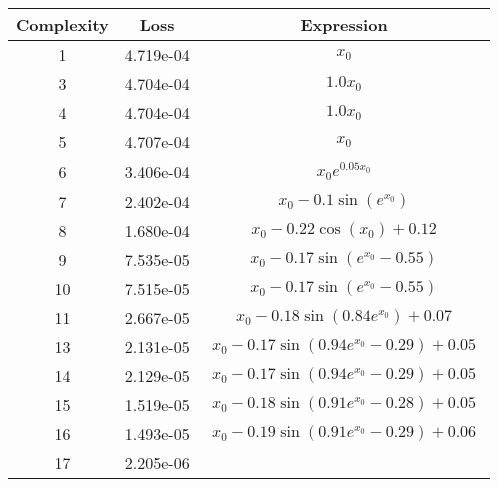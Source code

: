 \begin{center}
        \begin{tabular}{|c|c|c|}
        \hline
        Complexity & Loss & Expression \\
        \hline
        1 & 4.719e-04 & $\begin{aligned}x_{0}\end{aligned}$\\ \hline3 & 4.704e-04 & $\begin{aligned}1.0 x_{0}\end{aligned}$\\ \hline4 & 4.704e-04 & $\begin{aligned}1.0 x_{0}\end{aligned}$\\ \hline5 & 4.707e-04 & $\begin{aligned}x_{0}\end{aligned}$\\ \hline6 & 3.406e-04 & $\begin{aligned}x_{0} e^{0.05 x_{0}}\end{aligned}$\\ \hline7 & 2.402e-04 & $\begin{aligned}x_{0} - 0.1 \sin{\left(e^{x_{0}} \right)}\end{aligned}$\\ \hline8 & 1.680e-04 & $\begin{aligned}x_{0} - 0.22 \cos{\left(x_{0} \right)} + 0.12\end{aligned}$\\ \hline9 & 7.535e-05 & $\begin{aligned}x_{0} - 0.17 \sin{\left(e^{x_{0}} - 0.55 \right)}\end{aligned}$\\ \hline10 & 7.515e-05 & $\begin{aligned}x_{0} - 0.17 \sin{\left(e^{x_{0}} - 0.55 \right)}\end{aligned}$\\ \hline11 & 2.667e-05 & $\begin{aligned}x_{0} - 0.18 \sin{\left(0.84 e^{x_{0}} \right)} + 0.07\end{aligned}$\\ \hline13 & 2.131e-05 & $\begin{aligned}x_{0} - 0.17 \sin{\left(0.94 e^{x_{0}} - 0.29 \right)} + 0.05\end{aligned}$\\ \hline14 & 2.129e-05 & $\begin{aligned}x_{0} - 0.17 \sin{\left(0.94 e^{x_{0}} - 0.29 \right)} + 0.05\end{aligned}$\\ \hline15 & 1.519e-05 & $\begin{aligned}x_{0} - 0.18 \sin{\left(0.91 e^{x_{0}} - 0.28 \right)} + 0.05\end{aligned}$\\ \hline16 & 1.493e-05 & $\begin{aligned}x_{0} - 0.19 \sin{\left(0.91 e^{x_{0}} - 0.29 \right)} + 0.06\end{aligned}$\\ \hline17 & 2.205e-06 & 
\end{tabular}
\end{center}
